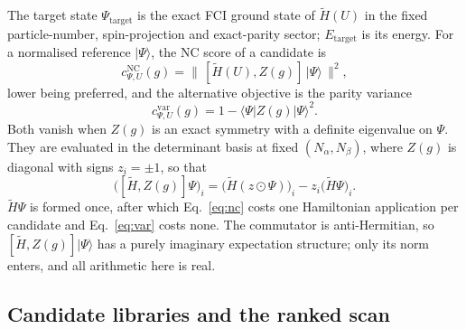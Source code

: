 \documentclass[11pt]{article}
\newcommand{\Ht}{\widetilde H}
\begin{document}
The target state $\Psi_{\mathrm{target}}$ is the exact FCI ground state of
$\Ht(U)$ in the fixed particle-number, spin-projection and exact-parity sector;
$E_{\mathrm{target}}$ is its energy. For a normalised reference
$|\Psi\rangle$, the NC score of a candidate is
\begin{equation}
c^{\mathrm{NC}}_{\Psi,U}(g)=\bigl\|\,[\Ht(U),Z(g)]\,|\Psi\rangle\,\bigr\|^{2},
\label{eq:nc}
\end{equation}
lower being preferred, and the alternative objective is the parity variance
\begin{equation}
c^{\mathrm{var}}_{\Psi,U}(g)=1-\langle\Psi|Z(g)|\Psi\rangle^{2}.
\label{eq:var}
\end{equation}
Both vanish when $Z(g)$ is an exact symmetry with a definite eigenvalue on
$\Psi$. They are evaluated in the determinant basis at fixed
$(N_\alpha,N_\beta)$, where $Z(g)$ is diagonal with signs $z_i=\pm1$, so that
\begin{equation}
\bigl([\Ht,Z(g)]\Psi\bigr)_i=\bigl(\Ht(z\odot\Psi)\bigr)_i-z_i\bigl(\Ht\Psi\bigr)_i .
\label{eq:commutator}
\end{equation}
$\Ht\Psi$ is formed once, after which Eq.~\eqref{eq:nc} costs one Hamiltonian
application per candidate and Eq.~\eqref{eq:var} costs none. The commutator is
anti-Hermitian, so $[\Ht,Z(g)]|\Psi\rangle$ has a purely imaginary expectation
structure; only its norm enters, and all arithmetic here is real.



\subsection{Candidate libraries and the ranked scan}
\end{document}

